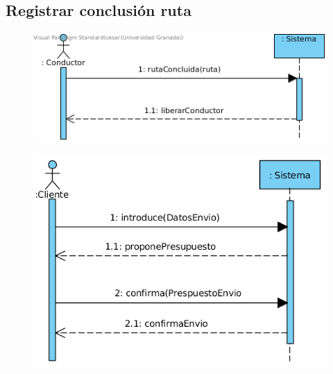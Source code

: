 \subsection{Registrar conclusión ruta}
\begin{figure}[H]
	\centering
	\includegraphics[width=16cm]{38}
\end{figure}
\begin{figure}[H]
	\centering
	\includegraphics[width=16cm]{39}
\end{figure}
